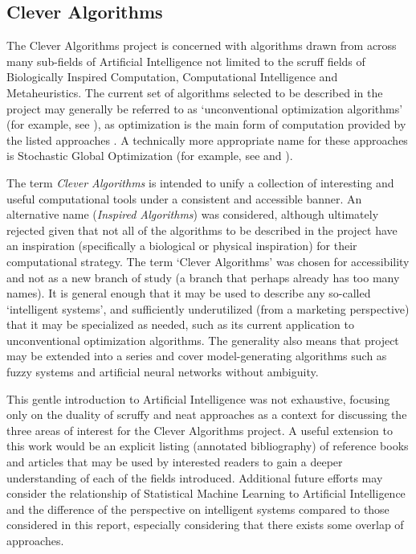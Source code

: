 % 
% 
\subsection{Clever Algorithms}
\label{sec:clever_algorithms}
The Clever Algorithms project is concerned with algorithms drawn from across many sub-fields of Artificial Intelligence not limited to the scruff fields of Biologically Inspired Computation, Computational Intelligence and Metaheuristics. 
The current set of algorithms selected to be described in the project may generally be referred to as `unconventional optimization algorithms' (for example, see \cite{Corne1999}), as optimization is the main form of computation provided by the listed approaches \cite{Brownlee2010b}. A technically more appropriate name for these approaches is Stochastic Global Optimization (for example, see \cite{Weise2007} and \cite{Luke2009}).

The term \emph{Clever Algorithms} is intended to unify a collection of interesting and useful computational tools under a consistent and accessible banner. An alternative name (\emph{Inspired Algorithms}) was considered, although ultimately rejected given that not all of the algorithms to be described in the project have an inspiration (specifically a biological or physical inspiration) for their computational strategy. The term `Clever Algorithms' was chosen for accessibility and not as a new branch of study (a branch that perhaps already has too many names). It is general enough that it may be used to describe any so-called `intelligent systems', and sufficiently underutilized (from a marketing perspective) that it may be specialized as needed, such as its current application to unconventional optimization algorithms. The generality also means that project may be extended into a series and cover model-generating algorithms such as fuzzy systems and artificial neural networks without ambiguity.

This gentle introduction to Artificial Intelligence was not exhaustive, focusing only on the duality of scruffy and neat approaches as a context for discussing the three areas of interest for the Clever Algorithms project. A useful extension to this work would be an explicit listing (annotated bibliography) of reference books and articles that may be used by interested readers to gain a deeper understanding of each of the fields introduced. Additional future efforts may consider the relationship of Statistical Machine Learning to Artificial Intelligence and the difference of the perspective on intelligent systems compared to those considered in this report, especially considering that there exists some overlap of approaches.

